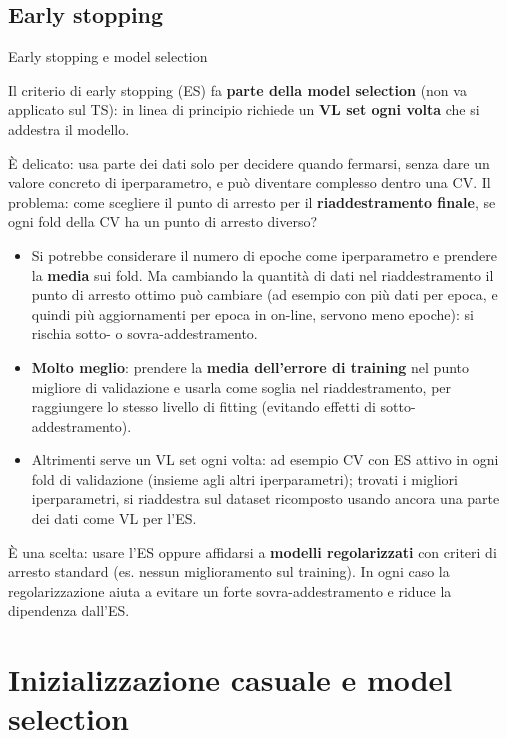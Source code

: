 \subsection{Early stopping}\label{early-stopping}

\begin{boxwarning}{Early stopping e model selection}

Il criterio di early stopping (ES) fa \textbf{parte della model
selection} (non va applicato sul TS): in linea di principio richiede un
\textbf{VL set ogni volta} che si addestra il modello.

\end{boxwarning}

È delicato: usa parte dei dati solo per decidere quando fermarsi, senza
dare un valore concreto di iperparametro, e può diventare complesso
dentro una CV. Il problema: come scegliere il punto di arresto per il
\textbf{riaddestramento finale}, se ogni fold della CV ha un punto di
arresto diverso?

\begin{itemize}
\tightlist
\item
  Si potrebbe considerare il numero di epoche come iperparametro e
  prendere la \textbf{media} sui fold. Ma cambiando la quantità di dati
  nel riaddestramento il punto di arresto ottimo può cambiare (ad
  esempio con più dati per epoca, e quindi più aggiornamenti per epoca
  in on-line, servono meno epoche): si rischia sotto- o
  sovra-addestramento.
\item
  \textbf{Molto meglio}: prendere la \textbf{media dell'errore di
  training} nel punto migliore di validazione e usarla come soglia nel
  riaddestramento, per raggiungere lo stesso livello di fitting
  (evitando effetti di sotto-addestramento).
\item
  Altrimenti serve un VL set ogni volta: ad esempio CV con ES attivo in
  ogni fold di validazione (insieme agli altri iperparametri); trovati i
  migliori iperparametri, si riaddestra sul dataset ricomposto usando
  ancora una parte dei dati come VL per l'ES.
\end{itemize}

È una scelta: usare l'ES oppure affidarsi a \textbf{modelli
regolarizzati} con criteri di arresto standard (es. nessun miglioramento
sul training). In ogni caso la regolarizzazione aiuta a evitare un forte
sovra-addestramento e riduce la dipendenza dall'ES.

\section{Inizializzazione casuale e model
selection}\label{inizializzazione-casuale-e-model-selection}

